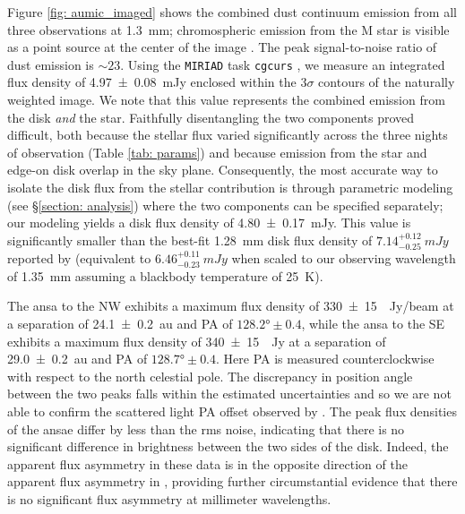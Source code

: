 \documentclass[modern]{aastex62}
\begin{document}
Figure \ref{fig: aumic_imaged} shows the combined dust continuum emission from all three observations at \SI{1.3}{mm}; chromospheric emission from the M star is visible as a point source at the center of the image \citep{cranmer13}. 
The peak signal-to-noise ratio of dust emission is $\sim 23$.
Using the \texttt{MIRIAD} task \texttt{cgcurs} \citep{sault95}, we measure an integrated flux density of \SI{4.97 \pm 0.08}{\milli Jy} enclosed within the $3\sigma$ contours of the naturally weighted image.  
We note that this value represents the combined emission from the disk \textit{and} the star. 
Faithfully disentangling the two components proved difficult, both because the stellar flux varied significantly across the three nights of observation (Table \ref{tab: params}) and because emission from the star and edge-on disk overlap in the sky plane.
Consequently, the most accurate way to isolate the disk flux from the stellar contribution is through parametric modeling (see \S \ref{section: analysis}) where the two components can be specified separately; our modeling yields a disk flux density of \SI{4.80 \pm 0.17}{mJy}.
This value is significantly smaller than the best-fit \SI{1.28}{mm} disk flux density of $7.14^{+0.12}_{-0.25}~\si{mJy}$ reported by \cite{macgregor13} (equivalent to $6.46^{+0.11}_{-0.23}~\si{mJy}$ when scaled to our observing wavelength of \SI{1.35}{mm} assuming a blackbody temperature of \SI{25}{K}).

The ansa to the NW exhibits a maximum flux density of \SI{330 \pm 15}{\mu Jy/beam} at a separation of \SI{24.1 \pm 0.2}{au} and PA of $\ang[angle-symbol-over-decimal]{128.2} \pm 0.4$, while the ansa to the SE exhibits a maximum flux density of \SI{340 \pm 15}{\mu Jy} at a separation of \SI{29.0 \pm 0.2}{au} and PA of $\ang[angle-symbol-over-decimal]{128.7} \pm 0.4$. 
Here PA is measured counterclockwise with respect to the north celestial pole.
The discrepancy in position angle between the two peaks falls within the estimated uncertainties and so we are not able to confirm the scattered light PA offset observed by \cite{boccaletti15}. 
The peak flux densities of the ansae differ by less than the rms noise, indicating that there is no significant difference in brightness between the two sides of the disk.
Indeed, the apparent flux asymmetry in these data is in the opposite direction of the apparent flux asymmetry in \cite{macgregor13}, providing further circumstantial evidence that there is no significant flux asymmetry at millimeter wavelengths. 
\end{document}
